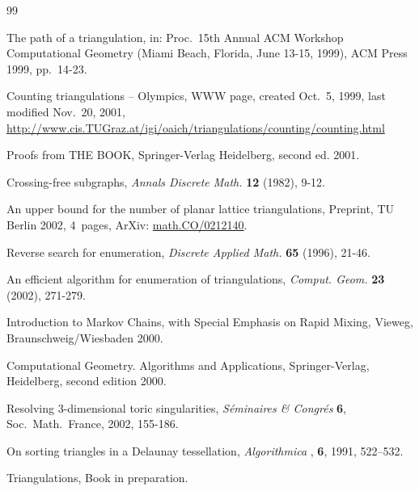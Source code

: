 \begin{thebibliography}{99}
\itemsep=-1.2pt

{The path of a triangulation,}
{in: Proc.\ 15th Annual ACM Workshop Computational Geometry
(Miami Beach, Florida, June 13-15, 1999), ACM Press 1999, pp.~14-23.}

{Counting triangulations -- Olympics,}
{WWW page, created Oct.~5, 1999, last modified Nov.~20, 2001,
\url{http://www.cis.TUGraz.at/igi/oaich/triangulations/counting/counting.html}}

{Proofs from THE BOOK,}
{Springer-Verlag Heidelberg, second ed. 2001.}


{Crossing-free subgraphs,}
{{\sl Annals Discrete Math.} {\bf 12} (1982), 9-12.}

{An upper bound for the number of planar lattice triangulations},
{Preprint, TU Berlin 2002, 4~pages, ArXiv: \url{math.CO/0212140}.}

{Reverse search for enumeration,}
{{\sl Discrete Applied Math.} {\bf 65} (1996), 21-46.} 

{An efficient algorithm for enumeration of triangulations,}
{{\sl Comput. Geom.} {\bf 23} (2002),  271-279.} 

{Introduction to Markov Chains, with Special Emphasis on Rapid Mixing,}
{Vieweg, Braunschweig/Wiesbaden 2000.}

{Computational Geometry. Algorithms and Applications,}
{Springer-Verlag, Heidelberg, second edition 2000.}

{Resolving $3$-dimensional toric singularities,}
{{\sl S\'eminaires \& Congr\'es} {\bf 6}, Soc.\ Math.\ France, 2002,
155-186.}

{On sorting triangles in a {D}elaunay tessellation},
{{\sl Algorithmica} , {\bf 6}, 1991, 522--532.}

{Triangulations,}
{Book in preparation.}


\end{thebibliography}
